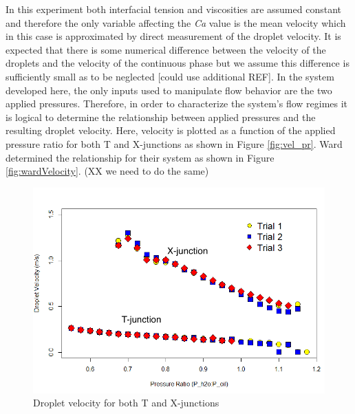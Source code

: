 In this experiment both interfacial tension and viscosities are assumed constant and therefore the only variable affecting the \emph{Ca} value is the mean velocity which in this case is approximated by direct measurement of the droplet velocity. It is expected that there is some numerical difference between the velocity of the droplets and the velocity of the continuous phase but we assume this difference is sufficiently small as to be neglected\cite{Ward2005} [could use additional  REF]. In the system developed here, the only inputs used to manipulate flow behavior are the two applied pressures. Therefore, in order to characterize the system's flow regimes it is logical to determine the relationship between applied pressures and the resulting droplet velocity. Here, velocity is plotted as a function of the applied pressure ratio for both T and X-junctions as shown in Figure \vref{fig:vel_pr}.  Ward determined the relationship for their system as shown in Figure \vref{fig:wardVelocity}. (XX we need to do the same)

\begin{figure}[h]
\centering 
\includegraphics[width=01.0\columnwidth]{vel_pr.PNG} 
\caption[Droplet Velocity as a function of Applied Control Pressure Ratio]{Droplet velocity for both T and X-junctions }
\label{fig:vel_pr} 
\end{figure}


